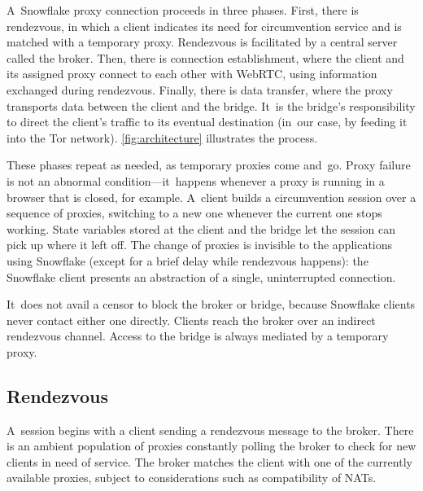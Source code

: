 \documentclass[letterpaper,twocolumn]{article}
\begin{document}
A~Snowflake proxy connection proceeds in three phases.
First, there is rendezvous, in which a client
indicates its need for circumvention service
and is matched with a temporary proxy.
Rendezvous is facilitated by a central server called the broker.
Then, there is connection establishment,
where the client and its assigned proxy connect to each other
with WebRTC, using information exchanged during rendezvous.
Finally, there is data transfer,
where the proxy transports data
between the client and the bridge.
It~is the bridge's responsibility to direct the client's traffic
to its eventual destination
(in~our case, by feeding it into the Tor network).
\autoref{fig:architecture} illustrates the process.

These phases repeat as needed, as temporary proxies come and~go.
Proxy failure is not an abnormal condition---it~happens whenever
a proxy is running in a browser that is closed, for example.
A~client builds a circumvention session over
a sequence of proxies, switching to a new one
whenever the current one stops working.
State variables stored at the client and the bridge
let the session can pick up where it left off.
The change of proxies is invisible to the applications using Snowflake
(except for a brief delay while rendezvous happens):
the Snowflake client presents an abstraction of a single, uninterrupted connection.

It~does not avail a censor to block the broker or bridge,
because Snowflake clients never contact either one directly.
Clients reach the broker over an indirect rendezvous channel.
Access to the bridge is always mediated by a temporary proxy.

\subsection{Rendezvous}
\label{sec:rendezvous}

A~session begins with a client sending a rendezvous message to the broker.
There is an ambient population of proxies
constantly polling the broker to check for new clients in need of service.
The broker matches the client with one of the currently available proxies,
subject to considerations such as compatibility of NATs.
\end{document}
